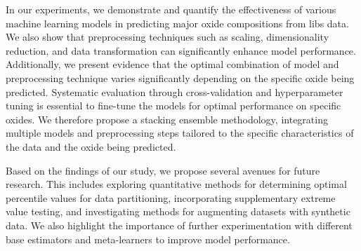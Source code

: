 \vspace{0.5em}

In our experiments, we demonstrate and quantify the effectiveness of various machine learning models in predicting major oxide compositions from \gls{libs} data.
We also show that preprocessing techniques such as scaling, dimensionality reduction, and data transformation can significantly enhance model performance.
Additionally, we present evidence that the optimal combination of model and preprocessing technique varies significantly depending on the specific oxide being predicted.
Systematic evaluation through cross-validation and hyperparameter tuning is essential to fine-tune the models for optimal performance on specific oxides.
We therefore propose a stacking ensemble methodology, integrating multiple models and preprocessing steps tailored to the specific characteristics of the data and the oxide being predicted.

\vspace{0.5em}

Based on the findings of our study, we propose several avenues for future research.
This includes exploring quantitative methods for determining optimal percentile values for data partitioning, incorporating supplementary extreme value testing, and investigating methods for augmenting datasets with synthetic data.
We also highlight the importance of further experimentation with different base estimators and meta-learners to improve model performance.

\glsresetall
